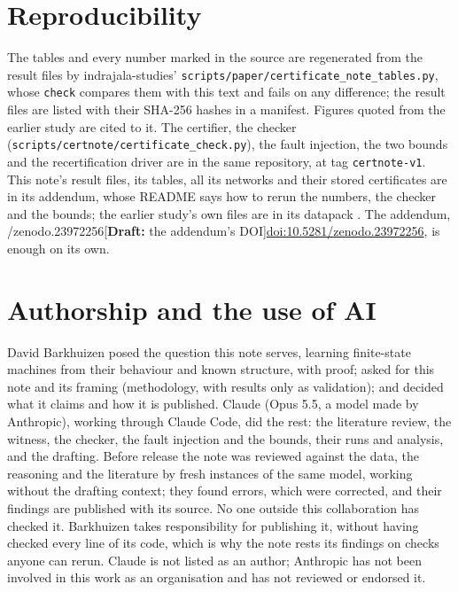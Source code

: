 \documentclass[11pt]{article}
\newcommand{\draftnote}[1]{\textcolor{red!70!black}{[\textbf{Draft:} #1]}}
\newcommand{\addendumdoi}{10.5281/zenodo.23972256}
\theoremstyle{definition}
\begin{document}
\section{Reproducibility}

The tables and every number marked in the source are regenerated from the result files by
indrajala-studies' \texttt{scripts/paper/certificate\_note\_tables.py}, whose \texttt{check} compares
them with this text and fails on any difference; the result files are listed with their SHA-256 hashes
in a manifest. Figures quoted from the earlier study are cited to it. The certifier, the checker
(\texttt{scripts/certnote/certificate\_check.py}), the fault injection, the two bounds and the
recertification driver are in the same repository, at tag \texttt{certnote-v1}. This note's result files,
its tables, all its networks and their stored certificates are in its addendum, whose README says how to
rerun the numbers, the checker and the bounds; the earlier study's own files are in its datapack
\citep{barkhuizen-2026-datapack}. The addendum,
\ifx\addendumdoi\empty\draftnote{the addendum's DOI}\else\href{https://doi.org/\addendumdoi}{doi:\addendumdoi}\fi,
is enough on its own.

\section*{Authorship and the use of AI}

David Barkhuizen posed the question this note serves, learning finite-state machines from their
behaviour and known structure, with proof; asked for this note and its framing (methodology, with
results only as validation); and decided what it claims and how it is published. Claude (Opus 5.5,
a model made by Anthropic), working through Claude Code, did the rest: the literature review, the
witness, the checker, the fault injection and the bounds, their runs and analysis, and the drafting.
Before release the note was reviewed against the data, the reasoning and the literature by fresh instances
of the same model, working without the drafting context; they found errors, which were corrected, and their
findings are published with its source. No one outside this collaboration has checked it. Barkhuizen takes responsibility for publishing it,
without having checked every line of its code, which is why the note rests its findings on checks
anyone can rerun. Claude is not listed as an author; Anthropic has not been involved in this work as
an organisation and has not reviewed or endorsed it.



\end{document}
